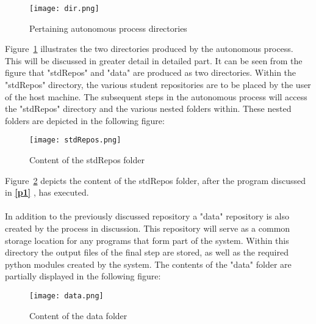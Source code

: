 \begin{figure}[H]
\begin{center}
\texttt{[image: dir.png]}
\caption{Pertaining autonomous process directories}
\label{dir}
\end{center}
\end{figure}

Figure~\ref{dir} illustrates the two directories produced by the autonomous process. This will be discussed in greater detail in \color{green} detailed part\color{black}. It can be seen from the figure that "stdRepos" and "data" are produced as two directories. Within the "stdRepos" directory, the various student repositories are to be placed by the user of the host machine. The subsequent steps in the autonomous process will access the "stdRepos" directory and the various nested folders within. These nested folders are depicted in the following figure:

\begin{figure}[H]
\begin{center}
\texttt{[image: stdRepos.png]}
\caption{Content of the stdRepos folder}
\label{stdRepos}
\end{center}
\end{figure}

Figure~\ref{stdRepos} depicts the content of the stdRepos folder, after the program discussed in \textbf{\ref{p1} }, has executed.
\\\\
In addition to the previously discussed repository a "data" repository is also created by the process in discussion. This repository will serve as a common storage location for any programs that form part of the system. Within this directory the output files of the final step are stored, as well as the required python modules created by the system. The contents of the "data" folder are partially displayed in the following figure:

\begin{figure}[H]
\begin{center}
\texttt{[image: data.png]} 
\caption{Content of the data folder}
\label{data}
\end{center}
\end{figure}

